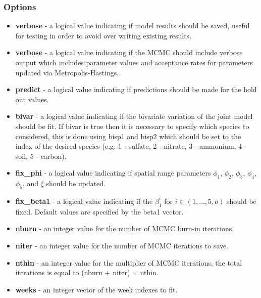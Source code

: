 \documentclass[11pt]{article}
\begin{document}
\subsubsection{Options}

\begin{itemize}

\item \textbf{verbose} - a logical value indicating if model results should be saved, useful for testing in order to avoid over writing existing results.

\item \textbf{verbose} - a logical value indicating if the MCMC should include verbose output which includes parameter values and acceptance rates for parameters updated via Metropolis-Hastings.

\item \textbf{predict} - a logical value indicating if predictions should be made for the hold out values.

\item \textbf{bivar} - a logical value indicating if the bivariate variation of the joint model should be fit. If bivar is true then it is necessary to specify which species to considered, this is done using bisp1 and bisp2 which should be set to the index of the desired species (e.g. 1 - sulfate, 2 - nitrate, 3 - ammonium, 4 - soil, 5 - carbon).

\item \textbf{fix\_phi} - a logical value indicating if spatial range parameters $\phi_1$, $\phi_2$, $\phi_3$, $\phi_4$, $\phi_5$, and $\xi$ should be updated.

\item \textbf{fix\_beta1} - a logical value indicating if the $\beta_1^i$ for $i \in (1,\ldots,5,o)$ should be fixed. Default values are specified by the beta1 vector.

\item \textbf{nburn} - an integer value for the number of MCMC burn-in iterations.

\item \textbf{niter} - an integer value for the number of MCMC iterations to save.

\item \textbf{nthin} - an integer value for the multiplier of MCMC iterations, the total iterations is equal to (nburn + niter) $\times$ nthin.

\item \textbf{weeks} - an integer vector of the week indexes to fit.

\end{itemize}
\end{document}

